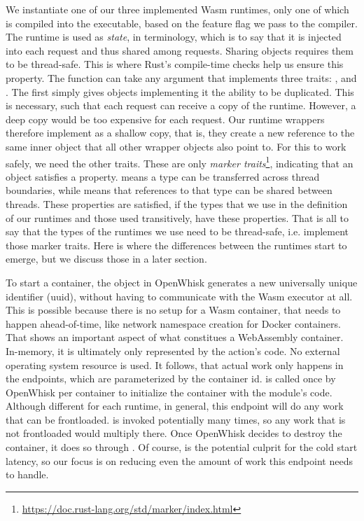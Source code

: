 We instantiate one of our three implemented Wasm runtimes, only one of which is compiled into the executable, based on the feature flag we pass to the compiler. The runtime is used as \emph{state}, in  terminology, which is to say that it is injected into each request and thus shared among requests. Sharing objects requires them to be thread-safe. This is where Rust's compile-time checks help us ensure this property. The  function can take any argument that implements three traits: ,  and . The first simply gives objects implementing it the ability to be duplicated. This is necessary, such that each request can receive a copy of the runtime. However, a deep copy would be too expensive for each request. Our runtime wrappers therefore implement  as a shallow copy, that is, they create a new reference to the same inner object that all other wrapper objects also point to. For this to work safely, we need the other traits. These are only \emph{marker traits}\footnote{\url{https://doc.rust-lang.org/std/marker/index.html}}, indicating that an object satisfies a property.  means a type can be transferred across thread boundaries, while  means that references to that type can be shared between threads. These properties are satisfied, if the types that we use in the definition of our runtimes and those used transitively, have these properties. That is all to say that the types of the runtimes we use need to be thread-safe, i.e. implement those marker traits. Here is where the differences between the runtimes start to emerge, but we discuss those in a later section.

To start a container, the  object in OpenWhisk generates a new universally unique identifier (uuid), without having to communicate with the Wasm executor at all. This is possible because there is no setup for a Wasm container, that needs to happen ahead-of-time, like network namespace creation for Docker containers.
That shows an important aspect of what constitues a WebAssembly container. In-memory, it is ultimately only represented by the action's code. No external operating system resource is used.
It follows, that actual work only happens in the endpoints, which are parameterized by the container id.  is called once by OpenWhisk per container to initialize the container with the module's code. Although different for each runtime, in general, this endpoint will do any work that can be frontloaded.  is invoked potentially many times, so any work that is not frontloaded would multiply there. Once OpenWhisk decides to destroy the container, it does so through .
Of course,  is the potential culprit for the cold start latency, so our focus is on reducing even the amount of work this endpoint needs to handle.

